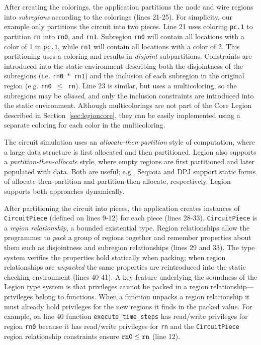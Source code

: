 After creating the colorings, the application partitions the node and wire
regions into {\em subregions} according to the colorings (lines 21-25).  For
simplicity, our example only partitions the circuit into two pieces.
Line 21 uses coloring {\tt pc.1} to partition {\tt rn} into {\tt rn0}, and {\tt rn1}.
Subregion {\tt rn0} will contain all locations with a color of 1 in {\tt pc.1},
while {\tt rn1} will contain all locations with a color of 2.  This
partitioning uses a coloring and results in {\em disjoint} subpartitions.
Constraints are introduced into the static environment describing both the
disjointness of the subregions (i.e. {\tt rn0 $*$ rn1}) and the inclusion of
each subregion in the original region (e.g. {\tt rn0 $\leq$ rn}).  Line
23 is similar, but uses a multicoloring, so the subregions may be {\em aliased},
and only the inclusion constraints are introduced into the static environment.
Although multicolorings are not part of the Core Legion described in 
Section~\ref{sec:legioncore}, they can be easily implemented using a separate 
coloring for each color in the multicoloring.

The circuit simulation uses an {\em allocate-then-partition} style of
computation, where a large data structure is first allocated and then
partitioned.  Legion also supports a {\em partition-then-allocate} style,
where empty regions are first partitioned and later populated with
data.  Both are useful; e.g., Sequoia \cite{Fatahalian06} and DPJ
\cite{Bocchino09} support static forms of allocate-then-partition and
partition-then-allocate, respectively.  Legion supports both
approaches dynamically.

After partitioning the circuit into pieces, the application creates
instances of {\tt CircuitPiece} (defined on lines 9-12) for each piece
(lines 28-33).  {\tt CircuitPiece} is a {\em region relationship}, a
bounded existential type.  Region relationships allow the programmer
to {\em pack} a group of regions together and remember properties
about them such as disjointness and subregion relationships (lines 29
and 33).  The type system verifies the properties hold statically when
packing; when region relationships are {\em unpacked} the same
properties are reintroduced into the static checking environment
(lines 40-41).  A key feature underlying the soundness of the Legion
type system is that privileges cannot be packed in a region
relationship---privileges belong to functions. When a function unpacks
a region relationship it must already hold privileges for the new
regions it finds in the packed value.  For example, on line 40
function {\tt execute\_time\_steps} has read/write privileges for
region {\tt rn0} because it has read/write privileges for {\tt rn} and
the {\tt CircuitPiece} region relationship constraints ensure $\tt rn0
\leq rn$ (line 12).

